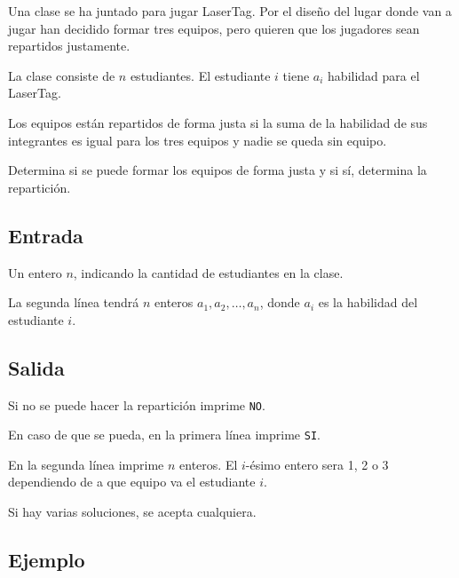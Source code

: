 Una clase se ha juntado para jugar LaserTag. Por el diseño del lugar donde van a jugar han decidido formar tres equipos, pero quieren que los jugadores sean repartidos justamente.

La clase consiste de \(n\) estudiantes. El estudiante \(i\) tiene \(a_i\) habilidad para el LaserTag. 

Los equipos están repartidos de forma justa si la suma de la habilidad de sus integrantes es igual para los tres equipos y nadie se queda sin equipo.

Determina si se puede formar los equipos de forma justa y si sí, determina la repartición.

\subsection*{Entrada}
Un entero \(n\), indicando la cantidad de estudiantes en la clase.

La segunda línea tendrá \(n\) enteros \(a_1, a_2, \ldots, a_n\), donde \(a_i\) es la habilidad del estudiante \(i\).

\subsection*{Salida}
Si no se puede hacer la repartición imprime \verb|NO|.

En caso de que se pueda, en la primera línea imprime \verb|SI|.

En la segunda línea imprime \(n\) enteros. El \(i\)-ésimo entero sera 1, 2 o 3 dependiendo de a que equipo va el estudiante \(i\). 

Si hay varias soluciones, se acepta cualquiera.

\subsection*{Ejemplo}
\begin{casebox3}
\end{casebox3}

